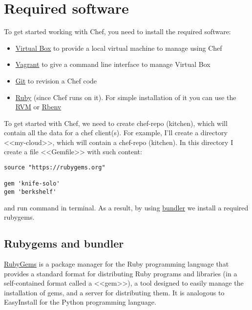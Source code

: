 \section{Required software}
\label{sec:solo-required}

To get started working with Chef, you need to install the required software:

\begin{itemize}
  \item \href{https://www.virtualbox.org/}{Virtual Box} to provide a local virtual machine to manage using Chef
  \item \href{http://www.vagrantup.com/}{Vagrant} to give a command line interface to manage Virtual Box
  \item \href{http://git-scm.com/}{Git} to revision a Chef code
  \item \href{https://www.ruby-lang.org}{Ruby} (since Chef runs on it). For simple installation of it you can use the \href{https://rvm.io/}{RVM} or \href{https://github.com/sstephenson/rbenv}{Rbenv}
\end{itemize}

To get started with Chef, we need to create chef-repo (kitchen), which will contain all the data for a chef client(s). For example, I'll create a directory <<my-cloud>>, which will contain a chef-repo (kitchen). In this directory I create a file <<Gemfile>> with such content:

\begin{lstlisting}[label=lst:my-cloud-required1,title=my-cloud/Gemfile]
source "https://rubygems.org"

gem 'knife-solo'
gem 'berkshelf'
\end{lstlisting}

and run command  in terminal. As a result, by using \href{http://bundler.io/}{bundler} we install a required rubygems.

\subsection{Rubygems and bundler}

\href{http://rubygems.org/}{RubyGems} is a package manager for the Ruby programming language that provides a standard format for distributing Ruby programs and libraries (in a self-contained format called a <<gem>>), a tool designed to easily manage the installation of gems, and a server for distributing them. It is analogous to EasyInstall for the Python programming language.

